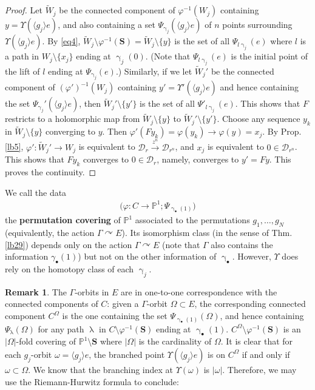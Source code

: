 \documentclass[12pt,a4paper,notitlepage]{article}
\theoremstyle{definition}
\newtheorem{rem}[df]{Remark}
\theoremstyle{plain}
\newcommand{\mc}{\mathcal}
\newcommand{\wtd}{\widetilde}
\newcommand{\bk}[1]{\langle {#1}\rangle}
\newcommand{\blt}{\bullet}
\newcommand{\Pbb}{\mathbb P}
\newcommand{\Sbf}{\mathbf{S}}
\numberwithin{equation}{subsection}
\begin{document}
\begin{proof}
Let $\wtd W_j$ be the connected component of $\varphi^{-1}(W_j)$ containing $y=\Upsilon(\bk{g_j}e)$, and also containing a set $\Psi_{\upgamma_j}(\bk{g_j}e)$ of $n$ points surrounding $\Upsilon(\bk{g_j}e)$. By \eqref{eq4}, $\wtd W_j\setminus\varphi^{-1}(\Sbf)=\wtd W_j\setminus\{y\}$ is  the set of all $\Psi_{l\upgamma_j}(e)$ where $l$ is a path in $W_j\setminus\{x_j\}$ ending at $\upgamma_j(0)$. (Note that $\Psi_{l\upgamma_j}(e)$ is the initial point of the lift of $l$ ending at $\Psi_{\upgamma_j}(e)$.) Similarly, if we let $\wtd W_j'$ be the connected component of $(\varphi')^{-1}(W_j)$ containing $y'=\Upsilon'(\bk{g_j}e)$ and hence containing the set $\Psi_{\upgamma_j}'(\bk{g_j}e)$, then $\wtd W_j'\setminus\{y'\}$ is the set of all $\Psi'_{l\upgamma_j}(e)$. This shows that $F$ restricts to a holomorphic map from $\wtd W_j\setminus\{y\}$ to $\wtd W_j'\setminus\{y'\}$. Choose any sequence $y_k$ in $\wtd W_j\setminus\{y\}$ converging to $y$. Then $\varphi'(Fy_k)=\varphi(y_k)\rightarrow \varphi(y)=x_j$. By Prop. \ref{lb5}, $\varphi':\wtd W_j'\rightarrow W_j$ is equivalent to $\mc D_r\xrightarrow{z^n}\mc D_{r^n}$, and $x_j$ is equivalent to $0\in\mc D_{r^n}$. This shows that $Fy_k$ converges to $0\in\mc D_r$, namely, converges to $y'=Fy$. This proves the continuity.
\end{proof}

We call the data \index{zz@$\varphi:C\rightarrow\Pbb^1$}
\begin{align*}
\big(\varphi:C\rightarrow\Pbb^1;\Psi_{\upgamma_\blt(1)}\big)
\end{align*}
the \textbf{permutation covering} of $\Pbb^1$ associated to the permutations $g_1,\dots,g_N$ (equivalently, the action $\Gamma\curvearrowright E$). Its isomorphism class (in the sense of Thm. \ref{lb29}) depends only on the action $\Gamma\curvearrowright E$ (note that $\Gamma$ also contains the information $\gamma_\blt(1)$) but not on the other information of $\upgamma_\blt$. However, $\Upsilon$ does rely on the homotopy class of each $\upgamma_j$.





\begin{rem}
The $\Gamma$-orbits in $E$ are in one-to-one correspondence with the connected components of $C$: given a $\Gamma$-orbit $\Omega\subset E$, the corresponding connected component $C^\Omega$ is the one containing the set $\Psi_{\upgamma_\blt(1)}(\Omega)$, and hence containing $\Psi_{\uplambda}(\Omega)$ for any path $\uplambda$ in $C\setminus\varphi^{-1}(\Sbf)$ ending at $\upgamma_\blt(1)$. $C^\Omega\setminus\varphi^{-1}(\Sbf)$ is an $|\Omega|$-fold covering of $\Pbb^1\setminus\Sbf$ where $|\Omega|$ is the cardinality of $\Omega$. It is clear that for each $g_j$-orbit $\omega=\bk{g_j}e$, the branched point $\Upsilon(\bk{g_j}e)$ is on $C^\Omega$ if and only if $\omega\subset\Omega$. We know that the branching index at $\Upsilon(\omega)$ is $|\omega|$. Therefore, we may use the Riemann-Hurwitz formula \cite[17.14]{For} to conclude:
\end{rem}
\end{document}
